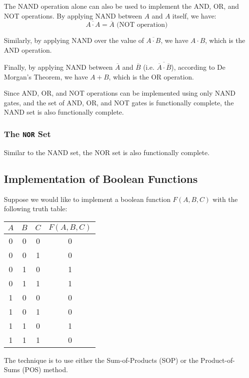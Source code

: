 The NAND operation alone can also be used to implement the AND, OR, and NOT operations.
By applying NAND between $A$ and $A$ itself, we have:
\begin{equation*}
    \overline{A\cdot A} = \overline{A} \text{ (NOT operation)}
\end{equation*}

Similarly, by applying NAND over the value of $\overline{A\cdot B}$, we have $A\cdot B$,
which is the AND operation.

Finally, by applying NAND between $\overline{A}$ and $\overline{B}$
(i.e. $\overline{\overline{A}\cdot\overline{B}}$), according to
De Morgan's Theorem, we have $A+B$, which is the OR operation.

Since AND, OR, and NOT operations can be implemented using only NAND gates,
and the set of AND, OR, and NOT gates is functionally complete, the NAND set is also
functionally complete.

\subsubsection{The \texttt{NOR} Set}

Similar to the NAND set, the NOR set is also functionally complete.

\subsection{Implementation of Boolean Functions}

Suppose we would like to implement a boolean function $F(A, B, C)$ with the following
truth table:

\begin{table}[h]
\centering
\begin{tabular}{|c|c|c||c|}
    \hline
    $A$ & $B$ & $C$ & $F(A, B, C)$ \\
    \hline
    0 & 0 & 0 & 0 \\
    0 & 0 & 1 & 0 \\
    0 & 1 & 0 & 1 \\
    0 & 1 & 1 & 1 \\
    1 & 0 & 0 & 0 \\
    1 & 0 & 1 & 0 \\
    1 & 1 & 0 & 1 \\
    1 & 1 & 1 & 0 \\
    \hline
\end{tabular}
\end{table}
The technique is to use either the Sum-of-Products (SOP) or the Product-of-Sums (POS) method.

